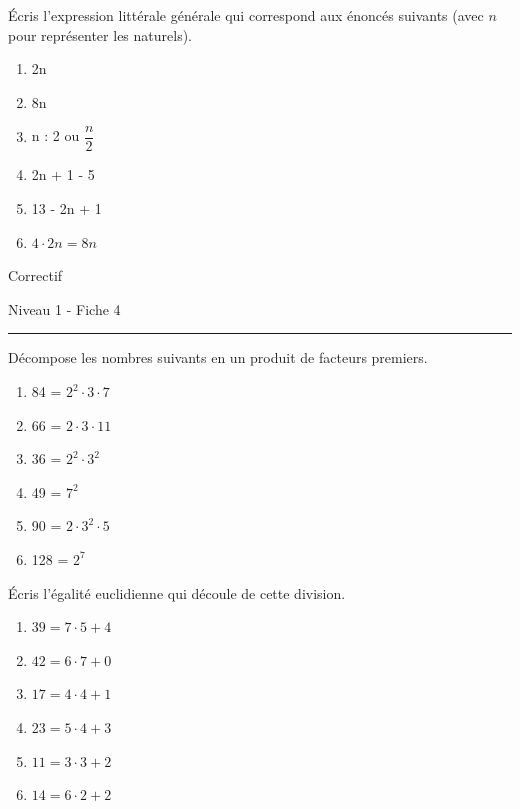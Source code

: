 \documentclass[12pt,parskip=half-, twoside=semi]{scrartcl}
\begin{document}
    \begin{exercise}
        Écris l'expression littérale générale qui correspond aux énoncés suivants (avec \(n\) pour représenter les naturels).
        \begin{enumerate}[cols=2]
            \item 2n
            \item 8n
            \item n : 2 ou \(\dfrac{n}{2}\) 
            \item 2n + 1 - 5 
            \item 13 - 2n + 1 
            \item \(4 \cdot 2n = 8n\) 
        \end{enumerate}
      \end{exercise}

\newpage


\begin{center}
  \bfseries
  \begin{Huge}
    Correctif
  \end{Huge}
  \smallbreak
  \begin{large}
    Niveau 1  - Fiche 4
  \end{large}
  \smallbreak
  \rule[10pt]{.5\linewidth}{1 pt}
\end{center}

\setcounter{exercise}{0}
      
      \begin{exercise}
        Décompose les nombres suivants en un produit de facteurs premiers.

          \begin{enumerate}[cols=3]
              \item 84 = $2^2 \cdot 3 \cdot 7$
              \item 66 = $2 \cdot 3 \cdot 11$
              \item 36 = $2^2 \cdot 3^2$
              \item 49 = $7^2$
              \item 90 = $2 \cdot 3^2 \cdot 5$
              \item 128 = $2^7$
            \end{enumerate}
      \end{exercise}
      
      
      \begin{exercise}
        Écris l'égalité euclidienne qui découle de cette
      division.
          \begin{enumerate}[cols=3]
            \item $39 = 7 \cdot 5 + 4$
            \item $42 = 6 \cdot 7 + 0$
            \item $17 = 4 \cdot 4 + 1$
            \item $23 = 5 \cdot 4 + 3$
            \item $11 = 3 \cdot 3 + 2$
            \item $14 = 6 \cdot 2 + 2$
          \end{enumerate}
      \end{exercise}
      
\end{document}
